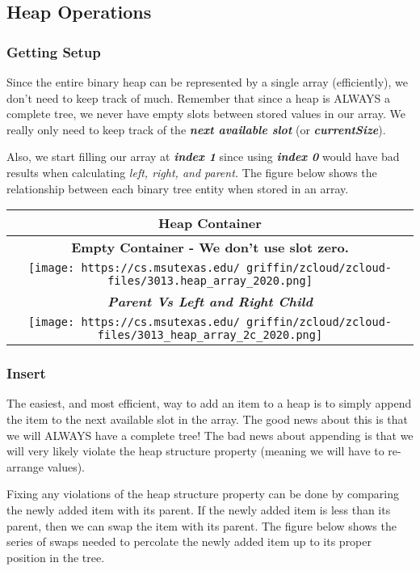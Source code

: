 \documentclass[
]{article}
\begin{document}
\hypertarget{heap-operations}{%
\subsection{Heap Operations}\label{heap-operations}}

\hypertarget{getting-setup}{%
\subsubsection{Getting Setup}\label{getting-setup}}

Since the entire binary heap can be represented by a single array
(efficiently), we don't need to keep track of much. Remember that since
a heap is ALWAYS a complete tree, we never have empty slots between
stored values in our array. We really only need to keep track of the
\textbf{\emph{next available slot}} (or \textbf{\emph{currentSize}}).

Also, we start filling our array at \textbf{\emph{index 1}} since using
\textbf{\emph{index 0}} would have bad results when calculating
\emph{left, right, and parent.} The figure below shows the relationship
between each binary tree entity when stored in an array.

\begin{longtable}[]{@{}c@{}}
\toprule
Heap Container\tabularnewline
\midrule
\endhead
\textbf{Empty Container - We don't use slot zero.}\tabularnewline
\texttt{[image: https://cs.msutexas.edu/~griffin/zcloud/zcloud-files/3013.heap\_array\_2020.png]}\tabularnewline
\textbf{\emph{Parent Vs Left and Right Child}}\tabularnewline
\texttt{[image: https://cs.msutexas.edu/~griffin/zcloud/zcloud-files/3013\_heap\_array\_2c\_2020.png]}\tabularnewline
\bottomrule
\end{longtable}

\hypertarget{insert}{%
\subsubsection{Insert}\label{insert}}

The easiest, and most efficient, way to add an item to a heap is to
simply append the item to the next available slot in the array. The good
news about this is that we will ALWAYS have a complete tree! The bad
news about appending is that we will very likely violate the heap
structure property (meaning we will have to re-arrange values).

Fixing any violations of the heap structure property can be done by
comparing the newly added item with its parent. If the newly added item
is less than its parent, then we can swap the item with its parent. The
figure below shows the series of swaps needed to percolate the newly
added item up to its proper position in the tree.
\end{document}
